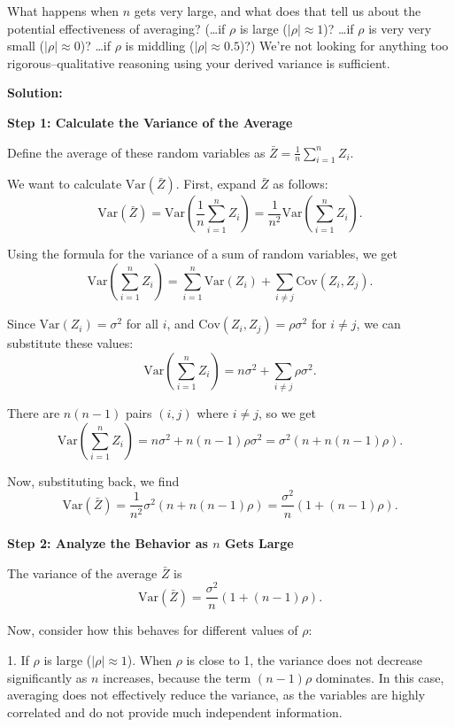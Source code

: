 \documentclass{article}
\newenvironment{solution}{\color{blue} \smallskip \textbf{Solution:}}{}
\begin{document}
\begin{enumerate}[(a)]
    What happens when $n$ gets very large, and what does that tell us about the potential effectiveness of averaging?  (\ldots if $\rho$ is large ($| \rho | \approx 1$)?  \ldots if $\rho$ is very very small ($|\rho| \approx 0$)?  \ldots if $\rho$ is middling ($|\rho| \approx 0.5$)?) 
    We're not looking for anything too rigorous--qualitative reasoning using your derived variance is sufficient.
    
    \begin{solution}


\textbf{Step 1: Calculate the Variance of the Average}

Define the average of these random variables as
\(\bar{Z} = \frac{1}{n} \sum_{i=1}^n Z_i\).

We want to calculate \(\text{Var}(\bar{Z})\). First, expand \(\bar{Z}\) as follows:
\[
\text{Var}(\bar{Z}) = \text{Var} \left( \frac{1}{n} \sum_{i=1}^n Z_i \right) = \frac{1}{n^2} \text{Var} \left( \sum_{i=1}^n Z_i \right).
\]

Using the formula for the variance of a sum of random variables, we get
\[
\text{Var} \left( \sum_{i=1}^n Z_i \right) = \sum_{i=1}^n \text{Var}(Z_i) + \sum_{i \neq j} \text{Cov}(Z_i, Z_j).
\]

Since \(\text{Var}(Z_i) = \sigma^2\) for all \( i \), and \(\text{Cov}(Z_i, Z_j) = \rho \sigma^2\) for \( i \neq j \), we can substitute these values:
\[
\text{Var} \left( \sum_{i=1}^n Z_i \right) = n \sigma^2 + \sum_{i \neq j} \rho \sigma^2.
\]

There are \(n(n - 1)\) pairs \( (i, j) \) where \( i \neq j \), so we get
\[
\text{Var} \left( \sum_{i=1}^n Z_i \right) = n \sigma^2 + n(n - 1) \rho \sigma^2 = \sigma^2 \left( n + n(n - 1) \rho \right).
\]

Now, substituting back, we find
\[
\text{Var}(\bar{Z}) = \frac{1}{n^2} \sigma^2 \left( n + n(n - 1) \rho \right) = \frac{\sigma^2}{n} \left( 1 + (n - 1) \rho \right).
\]\\

\textbf{Step 2: Analyze the Behavior as \( n \) Gets Large}

The variance of the average \(\bar{Z}\) is
\[
\text{Var}(\bar{Z}) = \frac{\sigma^2}{n} \left( 1 + (n - 1) \rho \right).
\]

Now, consider how this behaves for different values of \(\rho\):

1. If \( \rho \) is large (\( |\rho| \approx 1 \)). When \(\rho\) is close to 1, the variance does not decrease significantly as \( n \) increases, because the term \((n - 1) \rho\) dominates. In this case, averaging does not effectively reduce the variance, as the variables are highly correlated and do not provide much independent information.


\end{solution}
\end{enumerate}
\end{document}
